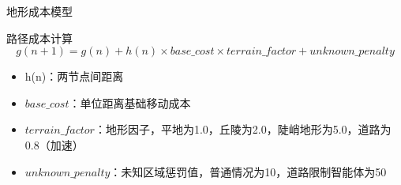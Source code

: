 \documentclass[
10pt,
aspectratio=169,
]{beamer}
\begin{document}
\begin{frame}{地形成本模型}
    \begin{block}{路径成本计算}
        \begin{equation}
           g(n+1) = g(n) + h(n) \times base\_cost \times terrain\_factor + unknown\_penalty
        \end{equation}
    \end{block}

    \begin{itemize}
\item h(n)：两节点间距离
\item $base\_cost$：单位距离基础移动成本
\item $terrain\_factor$：地形因子，平地为1.0，丘陵为2.0，陡峭地形为5.0，道路为0.8（加速）
\item $unknown\_penalty$：未知区域惩罚值，普通情况为10，道路限制智能体为50
\end{itemize}

\end{frame}
\end{document}
